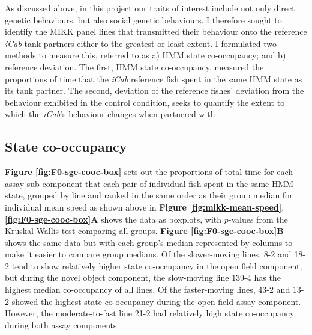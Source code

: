 \documentclass[
]{book}
\begin{document}
As discussed above, in this project our traits of interest include not only direct genetic behaviours, but also social genetic behaviours. I therefore sought to identify the MIKK panel lines that transmitted their behaviour onto the reference \emph{\textcolor{iCab_424B4D}{iCab}} tank partners either to the greatest or least extent. I formulated two methods to measure this, referred to as a) HMM state co-occupancy; and b) reference deviation. The first, HMM state co-occupancy, measured the proportions of time that the \emph{\textcolor{iCab_424B4D}{iCab}} reference fish spent in the same HMM state as its tank partner. The second, deviation of the reference fishes' deviation from the behaviour exhibited in the control condition, seeks to quantify the extent to which the \emph{\textcolor{iCab_424B4D}{iCab}}'s behaviour changes when partnered with

\hypertarget{state-co-occupancy}{%
\subsection{State co-occupancy}\label{state-co-occupancy}}

\textbf{Figure \ref{fig:F0-sge-cooc-box}} sets out the proportions of total time for each assay sub-component that each pair of individual fish spent in the same HMM state, grouped by line and ranked in the same order as their group median for individual mean speed as shown above in \textbf{Figure \ref{fig:mikk-mean-speed}}. \textbf{\ref{fig:F0-sge-cooc-box}A} shows the data as boxplots, with \(p\)-values from the Kruskal-Wallis test comparing all groups. \textbf{Figure \ref{fig:F0-sge-cooc-box}B} shows the same data but with each group's median represented by columns to make it easier to compare group medians. Of the slower-moving lines, \textcolor{8-2_FF699C}{8-2} and \textcolor{18-2_FF66A6}{18-2} tend to show relatively higher state co-occupancy in the open field component, but during the novel object component, the slow-moving line \textcolor{139-4_FF61CC}{139-4} has the highest median co-occupancy of all lines. Of the faster-moving lines, \textcolor{43-2_F17D50}{43-2} and \textcolor{13-2_F57A5F}{13-2} showed the highest state co-occupancy during the open field assay component. However, the moderate-to-fast line \textcolor{21-2_49B500}{21-2} had relatively high state co-occupancy during both assay components.
\end{document}

